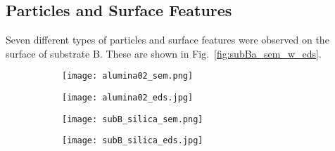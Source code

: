 \subsection{Particles and Surface Features}

Seven different types of particles and surface features were observed on the surface of substrate B. These are shown in Fig.~\ref{fig:subBa_sem_w_eds}.
\begin{figure}[htbp]
    \centering
    \begin{subfigure}[t]{\textwidth}
        \caption{}\label{fig:subBa_polishing-grit_alumina}
          \begin{minipage}[t]{0.43\linewidth}
            \centering
            \texttt{[image: alumina02\_sem.png]}
          \end{minipage}
          \hfill
          \begin{minipage}[t]{0.43\linewidth}
            \centering
            \texttt{[image: alumina02\_eds.jpg]}
          \end{minipage}
          \begin{minipage}[t]{0.11\linewidth}
            \centering
            \atomicTable[&][&][&]
          \end{minipage}
    \end{subfigure}%
    \par\bigskip
    \begin{subfigure}[t]{\textwidth}
        \caption{}\label{fig:subBa_polishing-grit_silica}
          \begin{minipage}[t]{0.43\linewidth}
            \centering
            \texttt{[image: subB\_silica\_sem.png]}
          \end{minipage}
          \hfill
          \begin{minipage}[t]{0.43\linewidth}
            \centering
            \texttt{[image: subB\_silica\_eds.jpg]}
          \end{minipage}
          \begin{minipage}[t]{0.11\linewidth}
            \centering
            \atomicTable[&][&][&]
          \end{minipage}
    \end{subfigure}%
    \par\bigskip
    \begin{subfigure}[t]{\textwidth}

\end{subfigure}
\end{figure}
